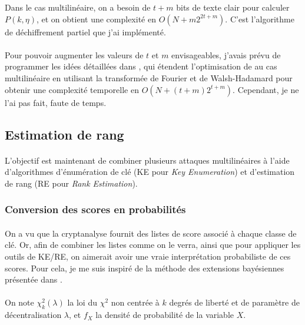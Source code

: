 \documentclass{scrartcl}
\begin{document}
Dans le cas multilinéaire, on a besoin de $t+m$ bits de texte clair pour calculer $P(k,\eta)$, et on obtient une
complexité en $O(N+m2^{2t+m})$. C'est l'algorithme de déchiffrement partiel que j'ai implémenté.

\paragraph*{}
Pour pouvoir augmenter les valeurs de $t$ et $m$ envisageables, j'avais prévu de programmer les idées détaillées dans
\cite{Nguyen2011}, qui étendent l'optimisation de \cite{Collard2007} au cas multilinéaire en utilisant la transformée de Fourier
et de Walsh-Hadamard pour obtenir une complexité temporelle en $O(N+(t+m)2^{t+m})$. Cependant, je ne l'ai pas fait, faute de temps.
\subsection{Estimation de rang}

\paragraph*{}
L'objectif est maintenant de combiner plusieurs attaques multilinéaires à l'aide d'algorithmes d'énumération de clé (KE
pour \textit{Key Enumeration}) et d'estimation de rang (RE pour \textit{Rank Estimation}).

\subsubsection{Conversion des scores en probabilités}

\paragraph*{}
On a vu que la cryptanalyse fournit des listes de score associé à chaque classe de clé. Or, afin de combiner les
listes comme on le verra, ainsi que pour appliquer les outils de KE/RE, on aimerait avoir une vraie interprétation
probabiliste de ces scores. Pour cela, je me suis inspiré de la méthode des extensions bayésiennes présentée dans \cite{bayesianExtension}.

\paragraph*{}
On note $\chi^2_k(\lambda)$ la loi du $\chi^2$ non centrée à $k$ degrés de liberté et de paramètre de décentralisation $\lambda$, et $f_X$ la
densité de probabilité de la variable $X$.  
\end{document}
